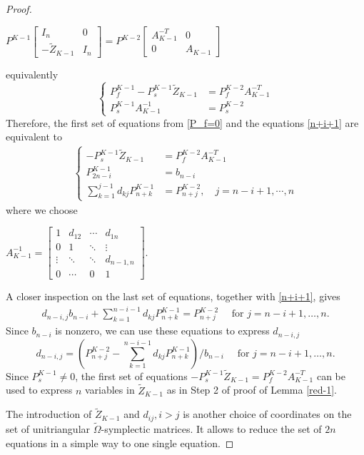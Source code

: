 \documentclass[10pt,a4paper]{amsart}
\begin{document}
\begin{proof}
\begin{center}
    $P^{K-1} \left[\begin{array}{ccc} I_n & 0 \\ -\tilde{Z}_{K-1} & I_n\end{array}\right] = P^{K-2} \left[\begin{array}{ccc} A^{-T}_{K-1} & 0 \\ 0 & A_{K-1}\end{array}\right]$
\end{center}
equivalently
\begin{equation}
\begin{cases}
    P^{K-1}_f - P^{K-1}_s \tilde{Z}_{K-1} &= P^{K-2}_f A^{-T}_{K-1} \\
    P^{K-1}_{s} A^{-1}_{K-1} &= P^{K-2}_{s} 
\end{cases}  
\end{equation}
Therefore, the first set of equations from \eqref{P_f=0} and the equations \eqref{n+i+1} are equivalent to 
\begin{align*}
    \begin{cases}
        - P^{K-1}_s \tilde{Z}_{K-1} &= P^{K-2}_f A^{-T}_{K-1} \\
        P^{K-1}_{2n-i} &= b_{n-i} \\
        \sum^{j-1}_{k=1}d_{kj}P^{K-1}_{n+k} & = P^{K-2}_{n+j}, \quad j = n-i+1, \cdots, n  
    \end{cases}
\end{align*}
where we choose 
\begin{center}
     $A^{-1}_{K-1}  = \left[\begin{array}{cccc} 1 & d_{12} & \cdots & d_{1n} \\  0 & 1 & \ddots & \vdots \\
    \vdots & \ddots & \ddots & d_{n-1,n} \\
    0 & \cdots & 0 & 1\end{array}\right]$.
\end{center}
A closer inspection on the last set of equations, together with \eqref{n+i+1}, gives
\begin{align}
    d_{n-i,j} b_{n-i} + \sum^{n-i-1}_{k=1}d_{kj}P^{K-1}_{n+k} = P^{K-2}_{n+j}  \quad \text{ for } j = n-i+1, \dots, n. 
\end{align}
Since $b_{n-i}$ is nonzero, we can use these equations to express $d_{n-i,j}$
\[
     d_{n-i,j} =  (P^{K-2}_{n+j} - \sum^{n-i-1}_{k=1}d_{kj}P^{K-1}_{n+k})/b_{n-i}  \quad  \text{ for } j = n-i+1, \dots, n. 
\]
Since $P^{K-1}_s \neq 0$, the first set of equations $- P^{K-1}_s \tilde{Z}_{K-1} = P^{K-2}_f A^{-T}_{K-1}$ can be used to express $n$ variables in $\tilde{Z}_{K-1}$ as in Step 2 of proof of Lemma \ref{red-1}. 

The introduction of $\tilde{Z}_{K-1}$ and $d_{ij}, i>j$ is another choice of coordinates on the set of unitriangular $\tilde{\Omega}$-symplectic matrices. It allows to reduce the set of $2n$ equations in a simple way to one single equation. 
\end{proof}
\end{document}
